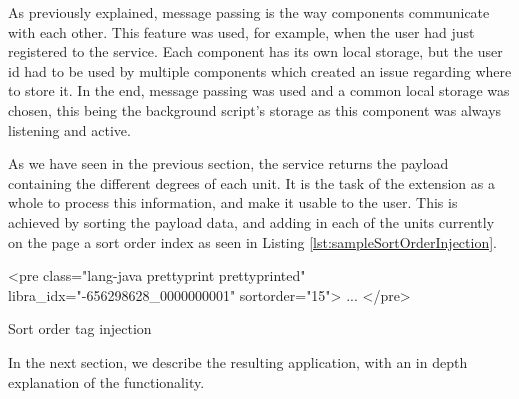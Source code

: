 As previously explained, message passing is the way components communicate with each other. This feature was used, for example, when the user had just registered to the service. Each component has its own local storage, but the user id had to be used by multiple components which created an issue regarding where to store it. In the end, message passing was used and a common local storage was chosen, this being the background script's storage as this component was always listening and active.






As we have seen in the previous section, the service returns the payload containing the different degrees of each unit. It is the task of the extension as a whole to process this information, and make it usable to the user. This is achieved by sorting the payload data, and adding in each of the units currently on the page a sort order index as seen in Listing \ref{lst:sampleSortOrderInjection}.
\begin{listing}[H]
\centering
\begin{htmlcode}
<pre class="lang-java prettyprint prettyprinted" libra_idx="-656298628_0000000001" sortorder="15">
	...
</pre>	
\end{htmlcode}
\caption{Sort order tag injection}
\label{lst:sampleSortOrderInjection}
\end{listing}
\noindent In the next section, we describe the resulting application, with an in depth explanation of the functionality.
